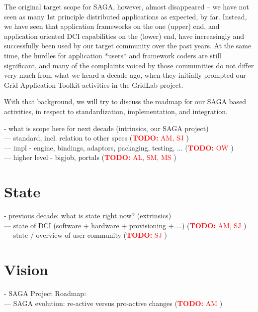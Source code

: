 \documentclass{article}
\newcommand{\B}[1]{\textbf{#1}}
\newcommand{\nind}{\noindent}
\newcommand{\todo}[1]{{\textcolor{red}{\B{TODO:} #1 }}}
\begin{document}
 The original target scope for SAGA, however, almost disappeared -- we
 have not seen as many 1st principle distributed applications as
 expected, by far.  Instead, we have seen that application frameworks
 on the one (upper) end, and application oriented DCI capabilities on
 the (lower) end, have increasingly and successfully been used by our
 target community over the past years.  At the same time, the hurdles
 for application *users* and framework coders are still significant,
 and many of the complaints voiced by those communities do not differ
 very much from what we heard a decade ago, when they initially
 prompted our Grid Application Toolkit activities in the GridLab
 project.

 With that background, we will try to discuss the roadmap for our SAGA
 based activities, in respect to standardization, implementation, and
 integration.

  \nind
  - what is scope here for next decade (intrinsics, our SAGA project)\\
  --- standard, incl. relation to other specs (\todo{AM, SJ} )\\
  --- impl - engine, bindings, adaptors, packaging, testing, ... (\todo{OW})\\
  --- higher level - bigjob, portals (\todo{AL, SM, MS})\\
      


\section{State}

    \nind
    - previous decade: what is state right now? (extrinsics)\\
    --- state of DCI (software + hardware + provisioning + ...) (\todo{AM, SJ})\\
    --- state / overview of user community (\todo{SJ})\\


\section{Vision}

    \nind
    - SAGA Project Roadmap:\\
    --- SAGA evolution: re-active versus pro-active changes (\todo{AM})\\
     
  
\end{document}

